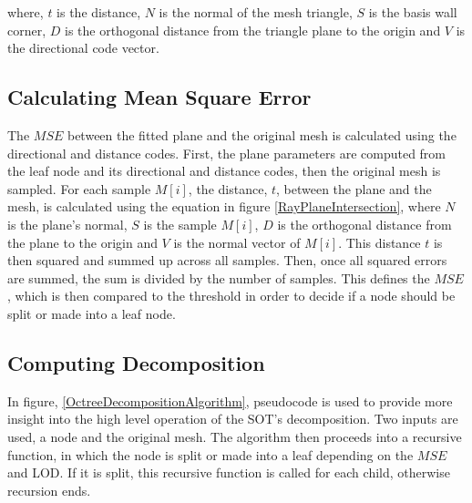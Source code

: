 where, $t$ is the distance, $N$ is the normal of the mesh triangle, $S$ is the basis wall corner, $D$ is the orthogonal distance from the triangle plane to the origin and $V$ is the directional code vector.

\subsection{Calculating Mean Square Error}

The $MSE$ between the fitted plane and the original mesh is calculated using the directional and distance codes. First, the plane parameters are computed from the leaf node and its directional and distance codes, then the original mesh is sampled. For each sample $M[i]$, the distance, $t$, between the plane and the mesh,  is calculated using the equation in figure \ref{RayPlaneIntersection}, where $N$ is the plane's normal, $S$ is the sample $M[i]$, $D$ is the orthogonal distance from the plane to the origin and $V$ is the normal vector of $M[i]$. This distance $t$ is then squared and summed up across all samples. Then, once all squared errors are summed, the sum is divided by the number of samples. This defines the $MSE$, which is then compared to the threshold in order to decide if a node should be split or made into a leaf node.

\subsection{Computing Decomposition}

In figure, \ref{OctreeDecompositionAlgorithm}, pseudocode is used to provide more insight into the high level operation of the SOT's decomposition. Two inputs are used, a node and the original mesh. The algorithm then proceeds into a recursive function, in which the node is split or made into a leaf depending on the $MSE$ and LOD. If it is split, this recursive function is called for each child, otherwise recursion ends. 

